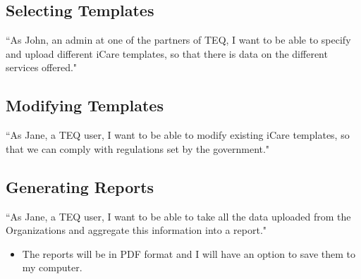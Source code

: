 \documentclass[12pt]{article}
\begin{document}
\subsection{Selecting Templates}
``As John, an admin at one of the partners of TEQ,  I want to be able to specify and upload different iCare templates, so that there is data on the different services offered."

\subsection{Modifying Templates}
``As Jane, a TEQ user,  I want to be able to modify existing iCare templates, so that we can comply with regulations set by the government."

\subsection{Generating Reports}
``As Jane, a TEQ user,  I want to be able to take all the data uploaded from the Organizations and aggregate this information into a report."
\begin{itemize}
\item The reports will be in PDF format and I will have an option to save them to my computer.
\end{itemize}


\newpage


\end{document}
